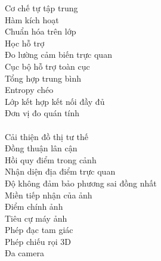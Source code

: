 \begin{keyword}
                  {Cơ chế tự tập trung}           \\
             {Hàm kích hoạt}                 \\
             {Chuẩn hóa trên lớp}            \\
              {Học hỗ trợ}                    \\
                 {Đo lường cảm biến trực quan}   \\
            {Cục bộ hỗ trợ toàn cục}        \\
                 {Tổng hợp trung bình}           \\
                   {Entropy chéo}                  \\
    {Lớp kết hợp kết nối đầy đủ}    \\
       {Đơn vị đo quán tính}           \\
    \\
         {Cải thiện đồ thị tư thế}       \\
          {Đồng thuận lân cận}	 		\\
          {Hồi quy điểm trong cảnh} 		\\
        {Nhận diện địa điểm trực quan} 	\\
       {Độ không đảm bảo phương sai đồng nhất} \\
                 {Miền tiếp nhận của ảnh}		\\
                 {Điểm chính ảnh}                \\
                    {Tiêu cự máy ảnh}               \\
                   {Phép đạc tam giác}             \\
                {Phép chiếu rọi 3D}             \\
                   {Đa camera}                     \\
\end{keyword}

